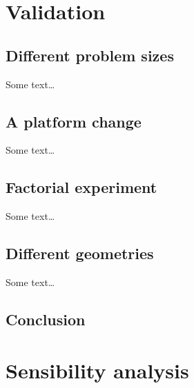\chapter{Validation}%
\label{chapter:prediction:validation}

    \section{Different problem sizes}%
    \label{sec:different_problem_sizes}
        Some text\dots

    \section{A platform change}%
    \label{sec:platform_change}
        Some text\dots

    \section{Factorial experiment}%
    \label{sec:factorial_experiment}
        Some text\dots

    \section{Different geometries}%
    \label{sec:different_geometries}
        Some text\dots

    \section{Conclusion}%

\chapter{Sensibility analysis}%
\label{chapter:prediction:sensibility}


